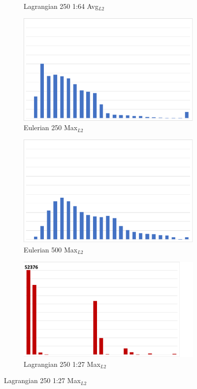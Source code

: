\begin{figure}
\begin{subfigure}{0.24\textwidth}
\caption{Lagrangian 250 1:64 Avg$_{L2}$}
\end{subfigure}
\begin{subfigure}{0.24\textwidth}
\centering
\includegraphics[width=0.7\linewidth]{results/sw4/Eul1_Max.pdf}
\caption{Eulerian 250 Max$_{L2}$}
\end{subfigure}
\hspace{1mm}
\begin{subfigure}{0.24\textwidth}
\centering
\includegraphics[width=0.7\linewidth]{results/sw4/Eul2_Max.pdf}
\caption{Eulerian 500 Max$_{L2}$}
\end{subfigure}
\hspace{1mm}
\begin{subfigure}{0.24\textwidth}
\centering
\includegraphics[width=0.8\linewidth]{results/sw4/Lag3_Max.pdf}
\caption{Lagrangian 250 1:27 Max$_{L2}$}
\end{subfigure}

\end{figure}
